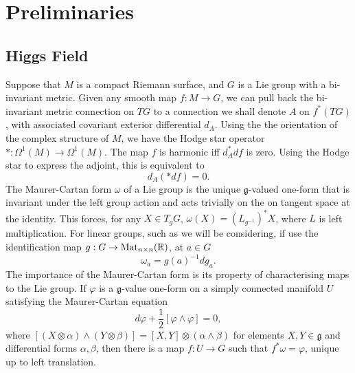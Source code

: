 
\chapter{Preliminaries}
\label{chp:Preliminaries}

\stoptocentries

\section{Higgs Field}

Suppose that $M$ is a compact Riemann surface, and $G$ is a Lie group with a bi-invariant metric. Given any smooth map $f: M\to G$, we can pull back the bi-invariant metric connection on $TG$ to a connection we shall denote $A$ on $f^*(TG)$, with associated covariant exterior differential $d_A$. Using the the orientation of the complex structure of $M$, we have the Hodge star operator $* : Ω^1(M) \to Ω^1(M)$. The map $f$ is harmonic iff $d_A^* df$ is zero. Using the Hodge star to express the adjoint, this is equivalent to
\[
d_A (* df) = 0.
\]
The Maurer-Cartan form $ω$ of a Lie group is the unique $\mathfrak{g}$-valued one-form that is invariant under the left group action and acts trivially on the on tangent space at the identity. This forces, for any $X\in T_gG$, $ω(X) = (L_{g^{-1}})^* X$, where $L$ is left multiplication. For linear groups, such as we will be considering, if use the identification map $g:G \to \Mat_{n\times n}(\R)$, at $a\in G$
\[
ω_a = g(a)^{-1} dg_a.
\]
The importance of the Maurer-Cartan form is its property of characterising maps to the Lie group. If $φ$ is a $\mathfrak{g}$-value one-form on a simply connected manifold $U$ satisfying the Maurer-Cartan equation
\[
dφ + \frac{1}{2}[φ\wedge φ] = 0,
\]
where $[(X\otimes α) \wedge (Y\otimes β)] = [X,Y]\otimes(α\wedge β)$ for elements $X,Y\in\mathfrak{g}$ and differential forms $α,β$, then there is a map $f:U \to G$ such that $f^*ω = φ$, unique up to left translation.

